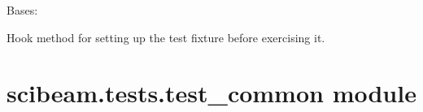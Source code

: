 \documentclass[letterpaper,10pt,english]{sphinxmanual}
\begin{document}
\begin{fulllineitems}
\label{\detokenize{scibeam.tests:scibeam.tests.test_base.TestFunctions}}
Bases: 

\begin{fulllineitems}
\label{\detokenize{scibeam.tests:scibeam.tests.test_base.TestFunctions.setUp}}
Hook method for setting up the test fixture before exercising it.

\end{fulllineitems}


\begin{fulllineitems}
\label{\detokenize{scibeam.tests:scibeam.tests.test_base.TestFunctions.test_is_mixin}}
\end{fulllineitems}


\end{fulllineitems}



\section{scibeam.tests.test\_common module}
\label{\detokenize{scibeam.tests:module-scibeam.tests.test_common}}\label{\detokenize{scibeam.tests:scibeam-tests-test-common-module}}
\end{document}

